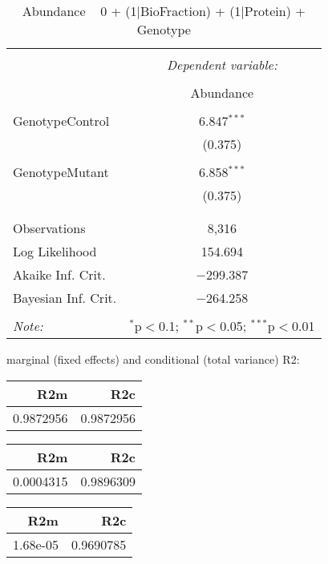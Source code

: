 \documentclass[11pt]{report}
\begin{document}
\begin{table}[!htbp] \centering 
  \caption{Abundance ~ 0 + (1|BioFraction) + (1|Protein) + Genotype} 
  \label{} 
\begin{tabular}{@{\extracolsep{5pt}}lc} 
\\[-1.8ex]\hline 
\hline \\[-1.8ex] 
 & \multicolumn{1}{c}{\textit{Dependent variable:}} \\ 
\cline{2-2} 
\\[-1.8ex] & Abundance \\ 
\hline \\[-1.8ex] 
 GenotypeControl & 6.847$^{***}$ \\ 
  & (0.375) \\ 
  & \\ 
 GenotypeMutant & 6.858$^{***}$ \\ 
  & (0.375) \\ 
  & \\ 
\hline \\[-1.8ex] 
Observations & 8,316 \\ 
Log Likelihood & 154.694 \\ 
Akaike Inf. Crit. & $-$299.387 \\ 
Bayesian Inf. Crit. & $-$264.258 \\ 
\hline 
\hline \\[-1.8ex] 
\textit{Note:}  & \multicolumn{1}{r}{$^{*}$p$<$0.1; $^{**}$p$<$0.05; $^{***}$p$<$0.01} \\ 
\end{tabular} 
\end{table} 
marginal (fixed effects) and conditional (total variance) R2:

\begin{tabular}{r|r}
\hline
R2m & R2c\\
\hline
0.9872956 & 0.9872956\\
\hline
\end{tabular}

\begin{tabular}{r|r}
\hline
R2m & R2c\\
\hline
0.0004315 & 0.9896309\\
\hline
\end{tabular}

\begin{tabular}{r|r}
\hline
R2m & R2c\\
\hline
1.68e-05 & 0.9690785\\
\hline
\end{tabular}
\end{document}
